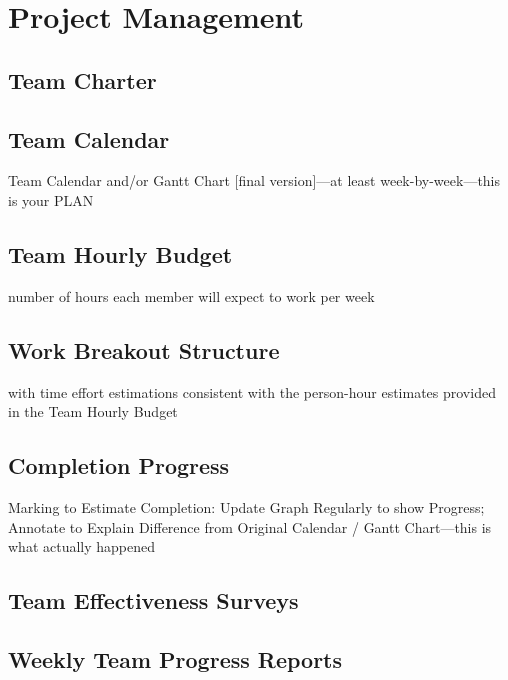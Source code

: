 \chapter{Project Management}
\section{Team Charter}
\section{Team Calendar}
 Team Calendar and/or Gantt Chart [final version]—at least week-by-week—this is your PLAN
\section{Team Hourly Budget}
number of hours each member will expect to work per week
\section{Work Breakout Structure}
with time effort estimations consistent with the person-hour estimates provided in the Team Hourly Budget
\section{Completion Progress}
Marking to Estimate Completion: Update Graph Regularly to show Progress; Annotate to
Explain Difference from Original Calendar / Gantt Chart—this is what actually happened
\section{Team Effectiveness Surveys}
\section{Weekly Team Progress Reports}
